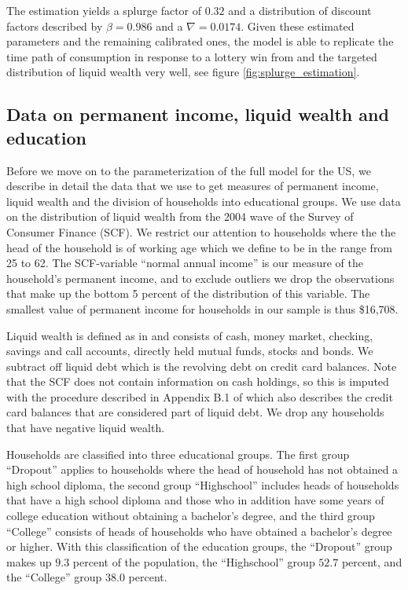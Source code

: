 \documentclass[11pt]{article}
\begin{document}
The estimation yields a splurge factor of $0.32$ and a distribution of discount factors described by $\beta = 0.986$ and a $\nabla=0.0174$. Given these estimated parameters and the remaining calibrated ones, the model is able to replicate the time path of consumption in response to a lottery win from \citet{fagereng_mpc_2021} and the targeted distribution of liquid wealth very well, see figure \ref{fig:splurge_estimation}.


\subsection{Data on permanent income, liquid wealth and education}
\label{sec:SCFdata}

Before we move on to the parameterization of the full model for the US, we describe in detail the data that we use to get measures of permanent income, liquid wealth and the division of households into educational groups. We use data on the distribution of liquid wealth from the 2004 wave of the Survey of Consumer Finance (SCF). We restrict our attention to households where the the head of the household is of working age which we define to be in the range from 25 to 62. The SCF-variable ``normal annual income'' is our measure of the household's permanent income, and to exclude outliers we drop the observations that make up the bottom 5 percent of the distribution of this variable. The smallest value of permanent income for households in our sample is thus \$16,708. 

Liquid wealth is defined as in \citet{kaplan2014model} and consists of cash, money market, checking, savings and call accounts, directly held mutual funds, stocks and bonds. We subtract off liquid debt which is the revolving debt on credit card balances. Note that the SCF does not contain information on cash holdings, so this is imputed with the procedure described in Appendix B.1 of \citet{kaplan2014model} which also describes the credit card balances that are considered part of liquid debt. We drop any households that have negative liquid wealth. 

Households are classified into three educational groups. The first group ``Dropout'' applies to households where the head of household has not obtained a high school diploma, the second group ``Highschool'' includes heads of households that have a high school diploma and those who in addition have some years of college education without obtaining a bachelor's degree, and the third group ``College'' consists of heads of households who have obtained a bachelor's degree or higher. With this classification of the education groups, the ``Dropout'' group makes up $9.3$ percent of the population, the ``Highschool'' group $52.7$ percent, and the ``College'' group $38.0$ percent. 
\end{document}
